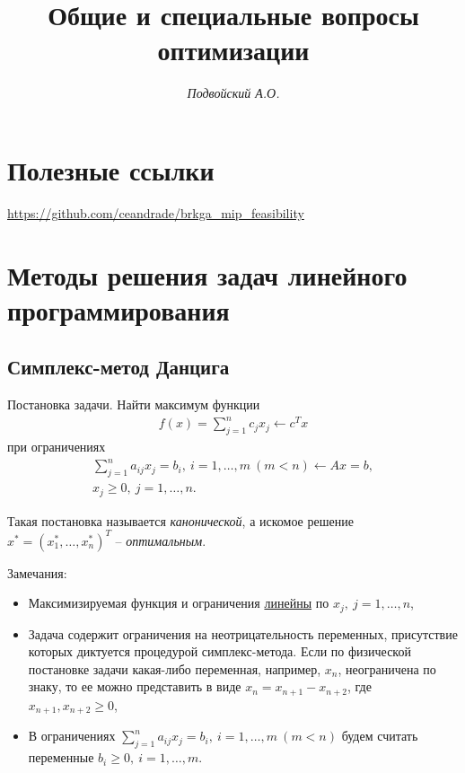 \documentclass[%
	11pt,
	a4paper,
	utf8,
		]{article}
\begin{document}
\title{Общие и специальные вопросы оптимизации}

\author{\itshape Подвойский А.О.}

\date{}
\maketitle

\thispagestyle{fancy}




\tableofcontents

\section{Полезные ссылки}

\url{https://github.com/ceandrade/brkga_mip_feasibility}

\section{Методы решения задач линейного программирования}

\subsection{Симплекс-метод Данцига}

Постановка задачи. Найти максимум функции
\begin{align*}
f(x) = \sum_{j=1}^{n} c_j x_j \leftarrow c^T x
\end{align*}
при ограничениях
\begin{align*}
	\sum_{j=1}^{n} a_{ij} x_j = b_i, \ i = 1, \ldots, m\  (m < n) \leftarrow Ax = b,\\
	x_j \geqslant 0, \ j = 1, \ldots, n.
\end{align*}

Такая постановка называется \emph{канонической}, а искомое решение $ x^{*} = (x_1^{*}, \ldots, x_n^{*})^T $ -- \emph{оптимальным}.

Замечания:
\begin{itemize}
	\item Максимизируемая функция и ограничения \underline{линейны} по $ x_j, \ j = 1, \ldots, n $,
	
	\item Задача содержит ограничения на неотрицательность переменных, присутствие которых диктуется процедурой симплекс-метода. Если по физической постановке задачи какая-либо переменная, например, $ x_n $, неограничена по знаку, то ее можно представить в виде $ x_n = x_{n+1} - x_{n+2} $, где $ x_{n+1}, x_{n+2} \geqslant 0 $,
	
	\item В ограничениях $ \sum\limits_{j=1}^{n} a_{ij} x_j = b_i, \ i = 1, \ldots, m\  (m < n) $ будем считать переменные $ b_i \geqslant 0, \ i = 1, \ldots, m $.
\end{itemize}
\end{document}
